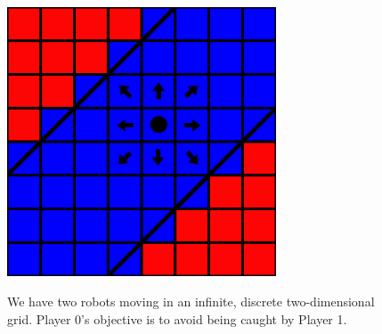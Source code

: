 \documentclass[10pt,a4paper]{article}
\theoremstyle{plain}
\theoremstyle{definition}
\begin{document}
\begin{figure}
  \caption{We have two robots moving in an infinite, discrete two-dimensional grid. Player 0's objective is to avoid being caught by Player 1.
}
  \centering
    {\includegraphics[width=8.0cm]{zwei_geraden.png}} 
\end{figure}
\newpage


\end{document}
